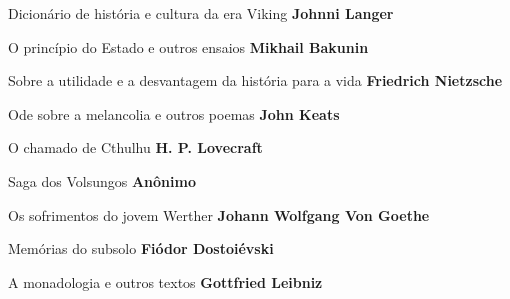 \begin{multicols}{2}
\begin{enumerate}
{\item Dicionário de história e cultura da era Viking \textbf{Johnni Langer} 
\item O princípio do Estado e outros ensaios \textbf{Mikhail Bakunin}
\item Sobre a utilidade e a desvantagem da história para a vida \textbf{Friedrich Nietzsche}
\item Ode sobre a melancolia e outros poemas \textbf{John Keats}
\item O chamado de Cthulhu \textbf{H. P. Lovecraft}
\item Saga dos Volsungos \textbf{Anônimo}
\item Os sofrimentos do jovem Werther \textbf{Johann Wolfgang Von Goethe}
\item Memórias do subsolo \textbf{Fiódor Dostoiévski}
\item A monadologia e outros textos \textbf{Gottfried Leibniz}
}
\end{enumerate}
\end{multicols}

\pagebreak
